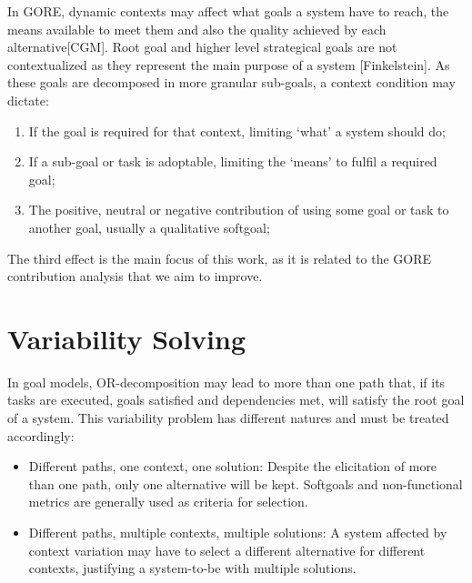 In GORE, dynamic contexts may affect what goals a system have to reach, the means available to meet them and also the quality achieved by each alternative[CGM]. Root goal and higher level strategical goals are not contextualized as they represent the main purpose of a system [Finkelstein]. As these goals are decomposed in more granular sub-goals, a context condition may dictate:

\begin{enumerate}

\item If the goal is required for that context, limiting `what' a system should do;
\medskip

\item If a sub-goal or task is adoptable, limiting the `means' to fulfil a required goal;
\medskip

\item The positive, neutral or negative contribution of using some goal or task to another goal, usually a qualitative softgoal;

\end{enumerate}

The third effect is the main focus of this work, as it is related to the GORE contribution analysis that we aim to improve.
 

\section{Variability Solving}

In goal models, OR-decomposition may lead to more than one path that, if its tasks are executed, goals satisfied and dependencies met, will satisfy the root goal of a system. This variability problem has different natures and must be treated accordingly:

\begin{itemize}

\item Different paths, one context, one solution: Despite the elicitation of more than one path, only one alternative will be kept. Softgoals and non-functional metrics are generally used as criteria for selection.
\medskip

\item Different paths, multiple contexts, multiple  solutions: A system affected by context variation may have to select a different alternative for different contexts, justifying a system-to-be with multiple solutions. 

\end{itemize}

